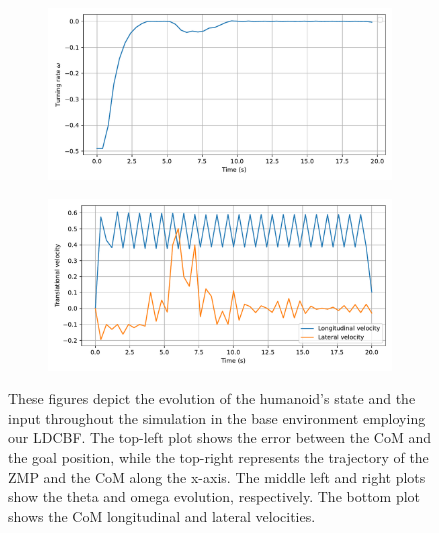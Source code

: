 \begin{figure}[H]
\begin{subfigure}{0.45\linewidth}
    \end{subfigure}
    \begin{subfigure}{0.45\linewidth}
        \centering
        \includegraphics[width=\linewidth]{figures/Simulations/sim1circles/evolution_3.pdf}
    \end{subfigure}
    \hfill
    \begin{subfigure}{0.45\linewidth}
        \centering
        \includegraphics[width=\linewidth]{figures/Simulations/sim1circles/evolution_1.pdf}
    \end{subfigure}
    \caption{These figures depict the evolution of the humanoid's state and the input throughout the simulation in the base environment employing our LDCBF. The top-left plot shows the error between the CoM and the goal position, while the top-right represents the trajectory of the ZMP and the CoM along the x-axis. The middle left and right plots show the theta and omega evolution, respectively. The bottom plot shows the CoM longitudinal and lateral velocities.}
    \label{fig:sim1_evol}
\end{figure}

